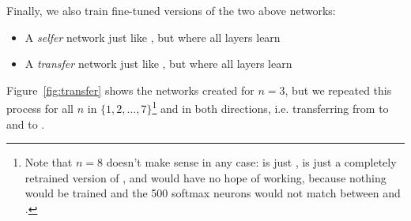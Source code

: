 Finally, we also train fine-tuned versions of the two above networks:

\begin{itemize}
\item A \emph{selfer} network  just like , but where all layers learn
\item A \emph{transfer} network  just like , but where all layers learn
\end{itemize}

Figure~\ref{fig:transfer} shows the networks created for $n = 3$, but we repeated this process for all $n$ in $\{1, 2, \ldots, 7\}$\footnote{Note that $n=8$ doesn't make sense in any case:  is just ,  is just a completely retrained version of , and  would have no hope of working, because nothing would be trained and the 500 softmax neurons would not match between \dA and \dB.} and in both directions, i.e. transferring from \dA to \dB and \dB to \dA.



